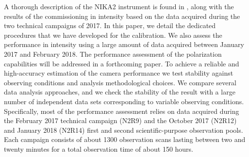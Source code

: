 A thorough description of the NIKA2 instrument is found in \citet{Adam2017},
along with the results of the commissioning in intensity based on the
data acquired during the two technical campaigns of 2017. In this paper, we
detail the dedicated procedures that we have developed for the
calibration. We also assess the performance in intensity using a large
amount of data acquired between January 2017 and February 2018. The performance
assessment of the polarization capabilities will be addressed in a
forthcoming paper.
To achieve a reliable and high-accuracy estimation
of the camera performance we test stability
against observing conditions and analysis
 methodological choices. We compare several data analysis approaches,
and we check the stability of the result with a large number of
independent data sets corresponding to variable observing conditions.
Specifically, most of the performance assessment relies on data
acquired during the February 2017 technical campaign (N2R9) and the
October 2017 (N2R12) and January 2018 (N2R14) first and second
scientific-purpose observation pools. Each campaign consists of about
1300 observation scans lasting between two and twenty minutes for a
total observation time of about 150 hours.

